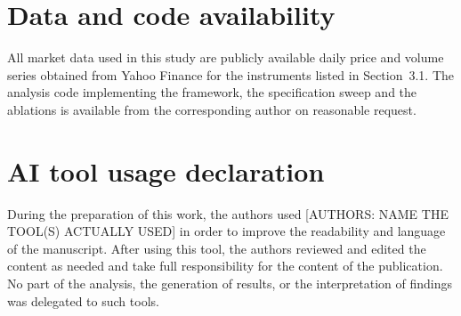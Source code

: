 \documentclass{singlecol-new}
\theoremstyle{TH}{
\newtheorem{lemma}{Lemma}
\newtheorem{theorem}[lemma]{Theorem}
\newtheorem{corrolary}[lemma]{Corrolary}
\newtheorem{conjecture}[lemma]{Conjecture}
\newtheorem{proposition}[lemma]{Proposition}
\newtheorem{claim}[lemma]{Claim}
\newtheorem{stheorem}[lemma]{Wrong Theorem}
\newtheorem{algorithm}{Algorithm}
}
\theoremstyle{THrm}{
\newtheorem{definition}{Definition}[section]
\newtheorem{question}{Question}[section]
\newtheorem{remark}{Remark}
\newtheorem{scheme}{Scheme}
}
\theoremstyle{THhit}{
\newtheorem{case}{Case}[section]
}
\begin{document}
\section*{Data and code availability}
All market data used in this study are publicly available daily price and volume series
obtained from Yahoo Finance for the instruments listed in Section~3.1. The analysis code
implementing the framework, the specification sweep and the ablations is available from
the corresponding author on reasonable request.

\section*{AI tool usage declaration}
During the preparation of this work, the authors used [AUTHORS: NAME THE TOOL(S)
ACTUALLY USED] in order to improve the readability and language of the manuscript. After
using this tool, the authors reviewed and edited the content as needed and take full
responsibility for the content of the publication. No part of the analysis, the
generation of results, or the interpretation of findings was delegated to such tools.
\end{document}
